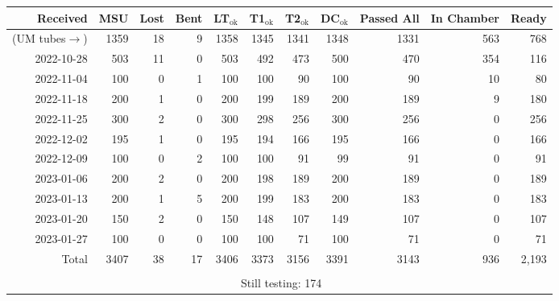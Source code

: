 \begin{tabular}{rrrrrrrrrrr}
\toprule
           Received &  MSU &  Lost &  Bent &  LT$_\text{ok}$ &  T1$_\text{ok}$ &  T2$_\text{ok}$ &  DC$_\text{ok}$ &  Passed All &  In Chamber &  Ready \\
\midrule
(UM tubes$\rightarrow$) & 1359 &    18 &     9 & 1358 &  1345 &  1341 &            1348 &        1331 &         563 &    768 \\\midrule
         2022-10-28 &  503 &    11 &     0 &  503 &   492 &   473 &             500 &         470 &         354 &    116 \\
         2022-11-04 &  100 &     0 &     1 &  100 &   100 &    90 &             100 &          90 &          10 &     80 \\
         2022-11-18 &  200 &     1 &     0 &  200 &   199 &   189 &             200 &         189 &           9 &    180 \\
         2022-11-25 &  300 &     2 &     0 &  300 &   298 &   256 &             300 &         256 &           0 &    256 \\
         2022-12-02 &  195 &     1 &     0 &  195 &   194 &   166 &             195 &         166 &           0 &    166 \\
         2022-12-09 &  100 &     0 &     2 &  100 &   100 &    91 &              99 &          91 &           0 &     91 \\
         2023-01-06 &  200 &     2 &     0 &  200 &   198 &   189 &             200 &         189 &           0 &    189 \\
         2023-01-13 &  200 &     1 &     5 &  200 &   199 &   183 &             200 &         183 &           0 &    183 \\
         2023-01-20 &  150 &     2 &     0 &  150 &   148 &   107 &             149 &         107 &           0 &    107 \\
         2023-01-27 &  100 &     0 &     0 &  100 &   100 &    71 &             100 &          71 &           0 &     71 \\
         \midrule
              Total & 3407 &    38 &    17 & 3406 &  3373 &  3156 &            3391 &        3143 &         936 &   2,193 \\
          \bottomrule
              \cline{5-8}\\
          &&&& \multicolumn{4}{c}{\small Still testing: 174} & &\\
          \cline{5-8}
\end{tabular}

